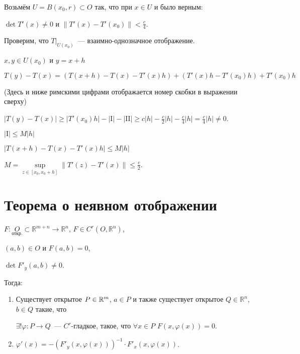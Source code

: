 \documentclass{article}
\begin{document}
            Возьмём $U = B(x_0, r) \subset O$ так, что при $x \in U$ и было верным:
            
                $\det T'(x) \neq 0$ и $\| T'(x) - T'(x_0) \| < \frac{c}{4}$.
                
            Проверим, что $T \big|_{U(x_0)}$~--- взаимно-однозначное отображение.
            
            $x, y \in U(x_0)$ и $y = x + h$
            
            $T(y) - T(x) = \left( T(x + h) - T(x) - T'(x) h \right) + \left( T'(x)h - T'(x_0)h \right) + T'(x_0)h$
        
            (Здесь и ниже римскими цифрами отображается номер скобки в выражении сверху)
            
            $\left| T(y) - T(x) \right| \geqslant \left| T'(x_0) h \right| - | \mathrm{I} | - | \mathrm{II} | \geqslant c |h| - \frac{c}{2} |h| - \frac{c}{4} |h| = \frac{c}{4} |h| \neq 0$.
            
            $| \mathrm{I} | \leqslant M |h|$
            
            $\left| T(x + h) - T(x) - T'(x) h \right| \leqslant M |h|$
            
            $M = \sup\limits_{z \in [x_0, x_0 + h]} \| T'(z) - T'(x) \| \leqslant \frac{c}{2}$.
            
    \newpage
    
    \section{Теорема о неявном отображении}
    
        $F : \underset{\text{откр.}}{O} \subset \mathbb{R}^{m + n} \rightarrow \mathbb{R}^n$, $F \in C^r \left( O, \mathbb{R}^n \right)$,
        
        $(a, b) \in O$ и $F(a, b) = 0$,
        
        $\det F'_y (a, b) \neq 0$.
        
        Тогда:
        
        \begin{enumerate}
        
            \item Существует открытое $P \in \mathbb{R}^m$, $a \in P$ и также существует открытое $Q \in \mathbb{R}^n$, $b \in Q$ такие, что
            
                $\exists ! \varphi : P \rightarrow Q$~--- $C^r$-гладкое, такое, что $\forall x \in P$ $F(x, \varphi(x)) = 0$.
                
            \item $\varphi'(x) = - \left(F'_y (x, \varphi(x)) \right)^{-1} \cdot F'_x (x, \varphi(x))$.
    
        \end{enumerate}
        
\end{document}

